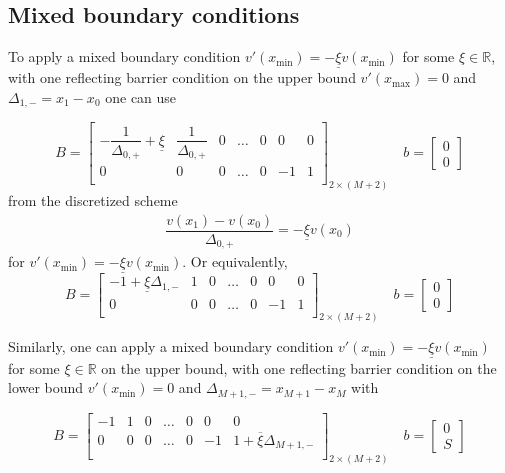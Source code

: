 \documentclass[11pt]{article}
\theoremstyle{definition}
\begin{document}
\subsection{Mixed boundary conditions}

To apply a mixed boundary condition $v'(x_{\min}) = - \underline{\xi} v(x_{\min}) $ for some $\xi \in \mathbb{R}$, with one reflecting barrier condition on the upper bound $v'(x_{\max}) = 0$ and $\Delta_{1,-} = x_1 - x_0$ one can use

\begin{equation}\label{eq:mixed-barrier-matrix-original}
B = \begin{bmatrix}
-\dfrac{1}{\Delta_{0,+}} + \underline{\xi} & \dfrac{1}{\Delta_{0,+}} & 0 & \dots & 0 & 0 & 0 \\
0 & 0 & 0 & \dots & 0 & -1 & 1\\
\end{bmatrix}_{2 \times (M+2)} \quad 
b = \begin{bmatrix}
0 \\
0
\end{bmatrix}
\end{equation}
from the discretized scheme
\begin{align}
\dfrac{v(x_1) - v(x_0)}{\Delta_{0,+}} = - \underline{\xi} v(x_0)
\end{align}
for $v'(x_{\min}) = - \underline{\xi} v(x_{\min})$. Or equivalently,
\begin{equation}\label{eq:mixed-barrier-matrix}
B = \begin{bmatrix}
-1 +  \underline{\xi} \Delta_{1,-} & 1 & 0 & \dots & 0 & 0 & 0 \\
0 & 0 & 0 & \dots & 0 & -1 & 1\\
\end{bmatrix}_{2 \times (M+2)} \quad 
b = \begin{bmatrix}
0 \\
0
\end{bmatrix}
\end{equation}

Similarly, one can apply a mixed boundary condition $v'(x_{\min}) = - \underline{\xi} v(x_{\min}) $ for some $\xi \in \mathbb{R}$ on the upper bound, with one reflecting barrier condition on the lower bound $v'(x_{\min}) = 0$ and $\Delta_{M+1,-} = x_{M+1} - x_M$ with


\begin{equation}\label{eq:mixed-barrier-matrix-ub}
B = \begin{bmatrix}
-1 & 1 & 0 & \dots & 0 & 0 & 0 \\
0 & 0 & 0 & \dots & 0 & -1 & 1 + \overline{\xi} \Delta_{M+1,-}   \\
\end{bmatrix}_{2 \times (M+2)} \quad 
b = \begin{bmatrix}
0 \\
S
\end{bmatrix}
\end{equation}
\end{document}
